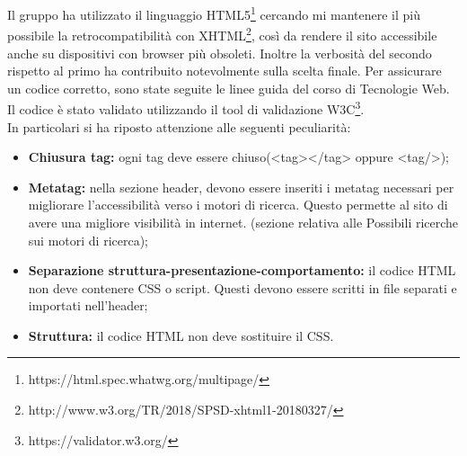 

Il gruppo ha utilizzato il linguaggio HTML5\footnote{https://html.spec.whatwg.org/multipage/} cercando mi mantenere il più possibile la
retrocompatibilità con XHTML\footnote{http://www.w3.org/TR/2018/SPSD-xhtml1-20180327/}, così da rendere il sito accessibile anche
su dispositivi con browser più obsoleti. Inoltre la verbosità del secondo rispetto al primo ha contribuito notevolmente sulla scelta finale.
Per assicurare un codice corretto, sono state seguite le linee guida del corso di Tecnologie Web.
Il codice è stato validato utilizzando il tool di validazione W3C\footnote{https://validator.w3.org/}.\\
In particolari si ha riposto attenzione alle seguenti peculiarità:
\begin{itemize}
    \item \textbf{Chiusura tag:} ogni tag deve essere chiuso(<tag></tag> oppure <tag/>);
    \item \textbf{Metatag:} nella sezione header, devono essere inseriti i metatag necessari per migliorare l'accessibilità verso i motori
    di ricerca. Questo permette al sito di avere una migliore visibilità in internet. (sezione relativa alle Possibili ricerche sui motori di ricerca);
    \item \textbf{Separazione struttura-presentazione-comportamento:} il codice HTML non deve contenere CSS o script. Questi devono essere
    scritti in file separati e importati nell'header;
    \item \textbf{Struttura:} il codice HTML non deve sostituire il CSS.
\end{itemize}

